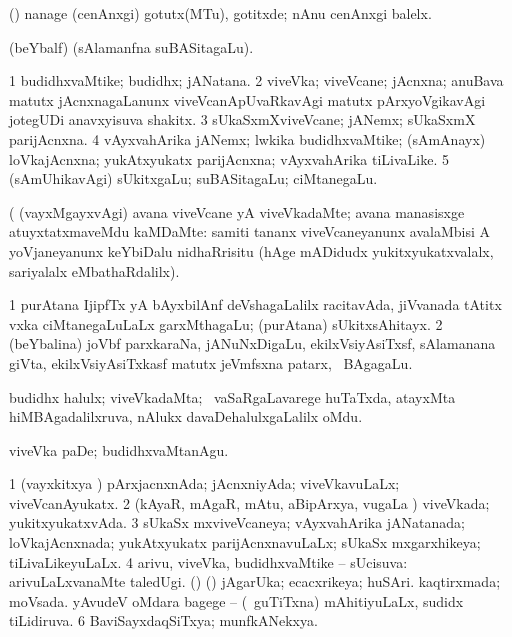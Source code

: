\bentry
{}
\gl{\akirx}
\bmng
(\pArxparx) nanage (cenAnxgi) gotutx(MTu), gotitxde; nAnu cenAnxgi balelx. 
\emng
\eentry

\bentry
{}
\gl{\saMkiSx}
\bmng
{} 
\emng
\eentry

\bentry
{}
\gl{\saMkiSx}
\bmng
{} (beYbalf) (sAlamanfna suBASitagaLu). 
\emng
\eentry

\bentry
{}
\gl{\nA}
\bmng
\bnum
\num{1} budidhxvaMtike; budidhx; jANatana. 
\num{2} viveVka; viveVcane; jAcnxna; anuBava matutx jAcnxnagaLanunx viveVcanApUvaRkavAgi matutx pArxyoVgikavAgi jotegUDi anavxyisuva shakitx. 
\num{3} sUkaSxmXviveVcane; jANemx; sUkaSxmX parijAcnxna. 
\num{4} vAyxvahArika jANemx; lwkika budidhxvaMtike; (sAmAnayx) loVkajAcnxna; yukAtxyukatx parijAcnxna; vAyxvahArika tiLivaLike. 
\num{5} (sAmUhikavAgi) sUkitxgaLu; suBASitagaLu; ciMtanegaLu. 
\enum
\emng

\noindent 
\gl{\pagu}
\bmng
{} (  (vayxMgayxvAgi) avana viveVcane yA viveVkadaMte; avana manasisxge atuyxtatxmaveMdu kaMDaMte:  samiti tananx viveVcaneyanunx avalaMbisi A yoVjaneyanunx keYbiDalu nidhaRrisitu (hAge mADidudx yukitxyukatxvalalx, sariyalalx eMbathaRdalilx). 
\emng
\eentry

\bentry
{}
\gl{\nA}
\bmng
\bnum
\num{1} purAtana IjipfTx yA bAyxbilAnf deVshagaLalilx racitavAda, jiVvanada tAtitx vxka ciMtanegaLuLaLx garxMthagaLu; (purAtana) sUkitxsAhitayx. 
\num{2} (beYbalina) joVbf parxkaraNa, jANuNxDigaLu, ekilxVsiyAsiTxsf, sAlamanana giVta, ekilxVsiyAsiTxkasf matutx jeVmfsxna patarx, \mo\ BAgagaLu. 
\enum
\emng
\eentry

\bentry
{} 
\gl{\nA}
\expl{}
\bmng
budidhx halulx; viveVkadaMta; \sA\ vaSaRgaLavarege huTaTxda, atayxMta hiMBAgadalilxruva, nAlukx davaDehalulxgaLalilx oMdu. 
\emng

\noindent
\gl{\pagu}
\bmng
{} viveVka paDe; budidhxvaMtanAgu. 
\emng
\eentry

\bentry
{} 
\gl{\gu}
\expl{}
\bmng
\bnum
\num{1} (vayxkitxya \vi) pArxjacnxnAda; jAcnxniyAda; viveVkavuLaLx; viveVcanAyukatx. 
\num{2} (kAyaR, mAgaR, mAtu, aBipArxya, \mo vugaLa \vi) viveVkada; yukitxyukatxvAda. 
\num{3} sUkaSx mxviveVcaneya; vAyxvahArika jANatanada; loVkajAcnxnada; yukAtxyukatx parijAcnxnavuLaLx; sUkaSx mxgarxhikeya; tiLivaLikeyuLaLx. 
\num{4} arivu, viveVka, budidhxvaMtike -- sUcisuva:  arivuLaLxvanaMte taledUgi. 
 (\ame) (\AmA) 
\banum
{} jAgarUka; ecacxrikeya; huSAri. 
 kaqtirxmada; moVsada. 
 yAvudeV oMdara bagege -- (\sA\ guTiTxna) mAhitiyuLaLx, sudidx tiLidiruva. 
\eanum
\numie
\num{6} BaviSayxdaqSiTxya; munfkANekxya. 
\enum
\emng

